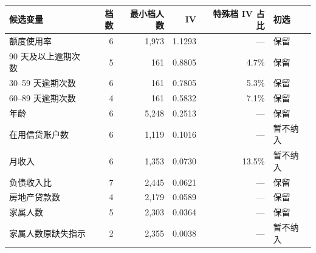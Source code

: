 \begin{tabular}{lrrrrl}
\toprule
候选变量 & 档数 & 最小档人数 & IV & 特殊档 IV 占比 & 初选 \\
\midrule
额度使用率 & 6 & 1,973 & 1.1293 & --- & 保留 \\
90 天及以上逾期次数 & 5 & 161 & 0.8805 & 4.7\% & 保留 \\
30–59 天逾期次数 & 6 & 161 & 0.7805 & 5.3\% & 保留 \\
60–89 天逾期次数 & 4 & 161 & 0.5832 & 7.1\% & 保留 \\
年龄 & 6 & 5,248 & 0.2513 & --- & 保留 \\
在用信贷账户数 & 6 & 1,119 & 0.1016 & --- & 暂不纳入 \\
月收入 & 6 & 1,353 & 0.0730 & 13.5\% & 暂不纳入 \\
负债收入比 & 7 & 2,445 & 0.0621 & --- & 保留 \\
房地产贷款数 & 4 & 2,179 & 0.0589 & --- & 保留 \\
家属人数 & 5 & 2,303 & 0.0364 & --- & 保留 \\
家属人数原缺失指示 & 2 & 2,355 & 0.0038 & --- & 暂不纳入 \\
\bottomrule
\end{tabular}
